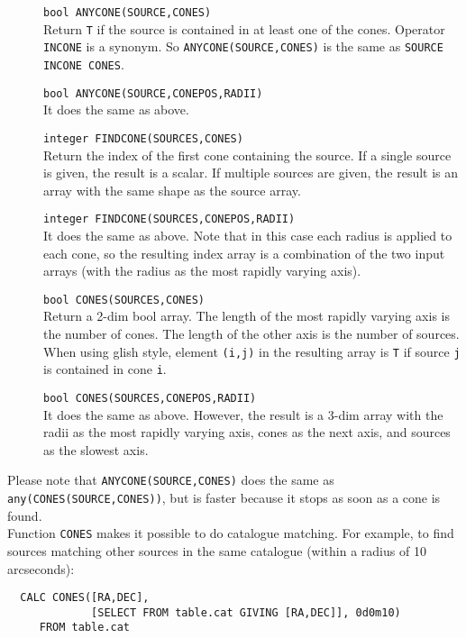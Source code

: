 \begin{description}
  \item[] \texttt{bool ANYCONE(SOURCE,CONES)}\\
       Return \texttt{T} if the source is contained in at least one of the cones.
       Operator \texttt{INCONE} is a synonym. So
       \texttt{ANYCONE(SOURCE,CONES)} is the same as
       \texttt{SOURCE INCONE CONES}.
  \item[] \texttt{bool ANYCONE(SOURCE,CONEPOS,RADII)}\\
       It does the same as above.
  \item[] \texttt{integer FINDCONE(SOURCES,CONES)}\\
       Return the index of the first cone containing the source.
       If a single source is given, the result is a scalar.
       If multiple sources are given, the result is an array with the
       same shape as the source array.
  \item[] \texttt{integer FINDCONE(SOURCES,CONEPOS,RADII)}\\
       It does the same as above. Note that in this case each radius is
       applied to each cone, so the resulting index array
       is a combination of the two input arrays
       (with the radius as the most rapidly varying axis).
  \item[] \texttt{bool CONES(SOURCES,CONES)}\\
       Return a 2-dim bool array. The length of the most rapidly
       varying axis is the
       number of cones. The length of the other axis is the number of
       sources. When using glish style, element \texttt{(i,j)}
       in the resulting array is \texttt{T}
       if source \texttt{j} is contained in cone \texttt{i}.
  \item[] \texttt{bool CONES(SOURCES,CONEPOS,RADII)}\\
       It does the same as above. However, the result is a 3-dim array
       with the radii as the most rapidly varying axis, cones as the
       next axis, and sources as the slowest axis.
\end{description}
Please note that \texttt{ANYCONE(SOURCE,CONES)} does the same as
\texttt{any(CONES(SOURCE,CONES))}, but is faster because it stops as
soon as a cone is found.
\\Function \texttt{CONES} makes it possible to do catalogue matching.
For example, to find sources matching other sources in the same
catalogue (within a radius of 10 arcseconds):
\begin{verbatim}
  CALC CONES([RA,DEC],
             [SELECT FROM table.cat GIVING [RA,DEC]], 0d0m10)
     FROM table.cat
\end{verbatim}
